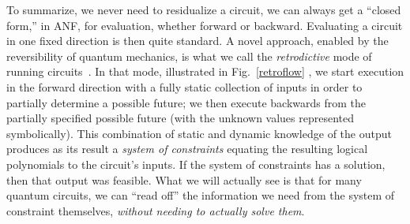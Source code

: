 \documentclass[sigplan,review]{acmart}
\theoremstyle{definition}
\begin{document}
To summarize, we never need to residualize a circuit, we can always
get a ``closed form,'' in ANF, for evaluation, whether forward or
backward. Evaluating a circuit in one fixed direction is then quite
standard. A novel approach, enabled by the reversibility of quantum
mechanics, is what we call the \emph{retrodictive} mode of running
circuits~\cite{retrodictive}. In that mode, illustrated in
Fig.~\ref{retroflow} , we start execution in the forward direction
with a fully static collection of inputs in order to partially
determine a possible future; we then execute backwards from the
partially specified possible future (with the unknown values
represented symbolically). This combination of static and dynamic
knowledge of the output produces as its result a \emph{system of
  constraints} equating the resulting logical polynomials to the
circuit's inputs. If the system of constraints has a solution, then
that output was feasible. What we will actually see is that for many
quantum circuits, we can ``read off'' the information we need from the
system of constraint themselves, \emph{without needing to actually
  solve them}.
\end{document}
